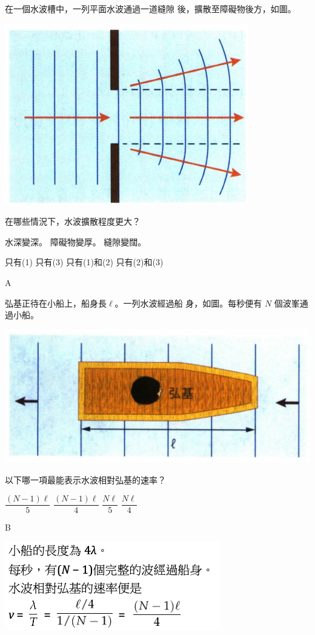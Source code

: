 {
    在一個水波槽中，一列平面水波通過一道縫隙 後，擴散至障礙物後方，如圖。
    \par{\par\centering\includegraphics[width=.35\textwidth]{./img/ch2_earlyclass_wave_mc_2024-05-13-21-27-55.png}\par}
    在哪些情況下，水波擴散程度更大？
    \begin{statements}
        \task 水深變深。
        \task 障礙物變厚。
        \task 縫隙變闊。
    \end{statements}
    \begin{tasks}
        \task 只有(1)
        \task 只有(3)
        \task 只有(1)和(2)
        \task 只有(2)和(3)
    \end{tasks}
}{\mckey A}

{
    弘基正待在小船上，船身長$\ell$。一列水波經過船 身，如圖。每秒便有 $N$ 個波峯通過小船。
    \par{\par\centering\includegraphics[width=.4\textwidth]{./img/ch2_earlyclass_wave_mc_2024-05-13-21-30-06.png}\par}
    以下哪一項最能表示水波相對弘基的速率？
    \begin{tasks}
        \task $\dfrac{(N-1)\ell}{5}$
        \task $\dfrac{(N-1)\ell}{4}$
        \task $\dfrac{N\ell}{5}$
        \task $\dfrac{N\ell}{4}$
    \end{tasks}

}{\mckey B
    \par{\par\includegraphics[width=.35\textwidth]{./img/ch2_earlyclass_wave_mc_2024-05-13-21-37-52.png}\par}}

